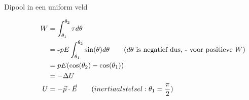 \begin{app}{Dipool in een uniform veld}
    \begin{minipage}{.5\textwidth}
            \begin{align*}
                \hspace{1.1cm}
                W &= \int_{\theta_1}^{\theta_2} \tau d\theta \\ 
                  &= \textbf{-}pE\int_{\theta_1}^{\theta_2} \sin(\theta) d\theta \quad \quad (\text{$d\theta$ is negatief dus, - voor positieve $W$}) \\
                  &= pE(\cos(\theta_{2})-\cos(\theta_{1})) \\
                  &= -\Delta U \\ 
                U &= -\Vec{p} \cdot \Vec{E} \quad \quad (inertiaalstelsel: \theta_1 = \dfrac{\pi}{2}) \\\\
           \end{align*}
    \end{minipage} 
    \begin{minipage}{.5\textwidth}
    \end{minipage}
    \vspace{-1cm}
\end{app}